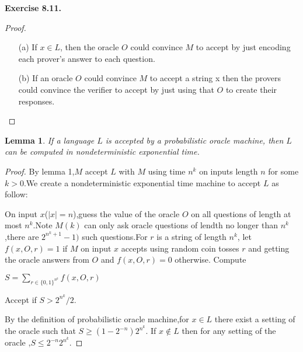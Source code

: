 \documentclass[a4paper]{article}
\newtheorem{lemma}{Lemma}
\newenvironment{exercise}[1]{
	\par
	\noindent\textbf{Exercise #1.}\quad
}{
	\par
	\bigskip
}
\begin{document}
\begin{exercise}{8.11}
\begin{proof}
			\begin{itemize}
				\item[(a)] If $x\in L$, then the oracle $O$ could convince $M$ to accept by just encoding each prover's answer to each question.
				\item[(b)] If an oracle $O$ could convince $M$ to accept a string x then the provers could convince the verifier to accept by just using that $O$ to create their responses.
			\end{itemize}
		\end{proof}

		\begin{lemma}
			If a language $L$ is accepted by  a probabilistic oracle machine, then $L$ can be computed in nondeterministic exponential time.
		\end{lemma}

		\begin{proof}
			By lemma 1,$M$ accept $L$ with $M$ using time $n^k$ on inputs length $n$ for some $k>0$.We create a nondeterministic exponential time machine to accept $L$ as follow:
		
			On input $x$($|x|=n$),guess the value of the oracle $O$ on all questions of length at most $n^k$.Note $M(k)$ can only ask oracle questions of lendth no longer than $n^k$,there are $2^{n^k +1} -1)$ such questions.For $r$ is a string of length $n^k$, let $f(x,O,r)=1$ if $M$ on input $x$ accepts using random coin tosses $r$ and getting the oracle answers from $O$ and $f(x,O,r)=0$ otherwise. Compute
			
					$S= \sum_{r \in \{0,1\}^{n^k}}f(x,O,r)$

			Accept if $S>2^{n^k}/2$.
			
			By the definition of probabilistic oracle machine,for $x\in L$ there exist a setting of the oracle such that $S\ge(1-2^{-n})2^{n^k}$. If $x \notin L$ then for any setting of the oracle ,$S\leq 2^{-n}2^{n^k}$.
		\end{proof}
	\end{exercise}
\end{document}
